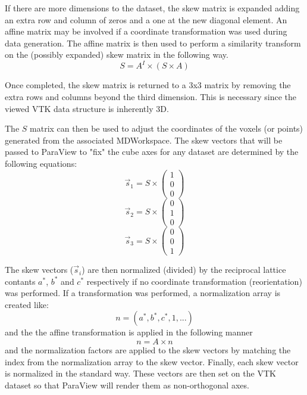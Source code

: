 \documentclass[11pt]{article}
\numberwithin{equation}{section}
\numberwithin{figure}{section}
\begin{document}
If there are more dimensions to the dataset, the skew matrix is expanded adding an extra row and column of zeros and a one at the new diagonal element. An affine matrix may be involved if a coordinate transformation was used during data generation. The affine matrix is then used to perform a similarity transform on the (possibly expanded) skew matrix in the following way.
\begin{equation}
S = A^{I} \times (S \times A)
\end{equation}

Once completed, the skew matrix is returned to a 3x3 matrix by removing the extra rows and columns beyond the third dimension. This is necessary since the viewed VTK data structure is inherently 3D. 

The $S$ matrix can then be used to adjust the coordinates of the voxels (or points) generated from the associated MDWorkspace. The skew vectors that will be passed to ParaView to "fix" the cube axes for any dataset are determined by the following equations:
\begin{equation}
\vec{s}_1 = S \times \left(\begin{array}{c}1\\0\\0\end{array}\right)
\end{equation}
\begin{equation}
\vec{s}_2 = S \times \left(\begin{array}{c}0\\1\\0\end{array}\right)
\end{equation}
\begin{equation}
\vec{s}_3 = S \times \left(\begin{array}{c}0\\0\\1\end{array}\right)
\end{equation}

The skew vectors ($\vec{s}_i$) are then normalized (divided) by the reciprocal lattice contants $a^*$, $b^*$ and $c^*$ respectively if no coordinate transformation (reorientation) was performed. If a transformation was performed, a normalization array is created like: 
\begin{equation}
n = (a^*, b^*, c^*, 1, ...)
\end{equation}
and the the affine transformation is applied in the following manner
\begin{equation}
n = A \times n
\end{equation}
and the normalization factors are applied to the skew vectors by matching the index from the normalization array to the skew vector. Finally, each skew vector is normalized in the standard way. These vectors are then set on the VTK dataset so that ParaView will render them as non-orthogonal axes.
\end{document}
